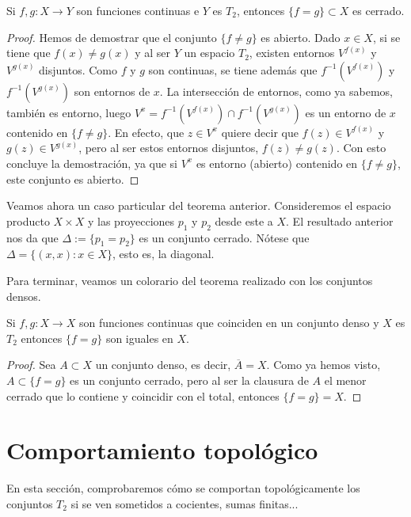 \begin{theo}
	Si $f,g:X\to Y$ son funciones continuas e $Y$ es $T_2$, entonces $\{f=g\}\subset X$ es cerrado. 
	\begin{proof}
		Hemos de demostrar que el conjunto $\{f\neq g\}$ es abierto. Dado $x\in X$, si se tiene que $f(x)\neq g(x)$ y al ser $Y$ un espacio $T_2$, existen entornos $V^{f(x)}$ y $V^{g(x)}$ disjuntos. Como $f$ y $g$ son continuas, se tiene además que $f^{-1}(V^{f(x)})$ y $f^{-1}(V^{g(x)})$ son entornos de $x$. La intersección de entornos, como ya sabemos, también es entorno, luego $V^x=f^{-1}(V^{f(x)})\cap f^{-1}(V^{g(x)})$ es un entorno de $x$ contenido en $\{f\neq g\}$. En efecto, que $z\in V^x$ quiere decir que $f(z)\in V^{f(x)}$ y $g(z)\in V^{g(x)}$, pero al ser estos entornos disjuntos, $f(z)\neq g(z)$. Con esto concluye la demostración, ya que si $V^x$ es entorno (abierto) contenido en $\{f\neq g\}$, este conjunto es abierto.
	\end{proof}
\end{theo}

Veamos ahora un caso particular del teorema anterior. Consideremos el espacio producto $X\times X$ y las proyecciones $p_1$ y $p_2$ desde este a $X$. El resultado anterior nos da que $\Delta:=\{p_1=p_2\}$ es un conjunto cerrado. Nótese que $\Delta=\{(x,x):x\in X\}$, esto es, la diagonal.

Para terminar, veamos un colorario del teorema realizado con los conjuntos densos.  

\begin{cor}
	Si $f,g:X\to X$ son funciones continuas que coinciden en un conjunto denso y $X$ es $T_2$ entonces $\{f=g\}$ son iguales en $X$. 
	\begin{proof}
		Sea $A\subset X$ un conjunto denso, es decir, $\overline{A}=X$. Como ya hemos visto, $A\subset \{f=g\}$ es un conjunto cerrado, pero al ser la clausura de $A$ el menor cerrado que lo contiene y coincidir con el total, entonces $\{f=g\}=X$.
	\end{proof}
\end{cor}

\section{Comportamiento topológico} 

En esta sección, comprobaremos cómo se comportan topológicamente los conjuntos $T_2$ si se ven sometidos a cocientes, sumas finitas...

